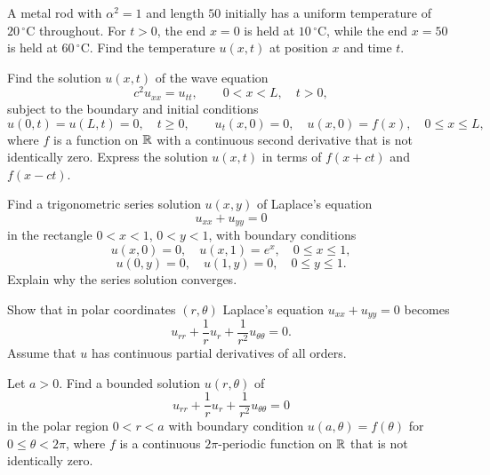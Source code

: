 \documentclass[11pt,oneside]{article}
\begin{document}
\begin{problem}
A metal rod with $\alpha^2=1$ and length $50$ initially has a uniform temperature of $20\,{}^\circ\mathrm C$ throughout. For $t>0$, the end $x=0$ is held at $10\,{}^\circ\mathrm C$, while the end $x=50$ is held at $60\,{}^\circ\mathrm C$. Find the temperature $u(x,t)$ at position $x$ and time $t$.
\end{problem}

\begin{problem}
Find the solution $u(x,t)$ of the wave equation
\[c^2u_{xx}=u_{tt},\qquad 0<x<L,\quad t>0,\]
subject to the boundary and initial conditions
\[u(0,t)=u(L,t)=0,\quad t\ge0,\qquad u_t(x,0)=0,\quad u(x,0)=f(x),\quad 0\le x\le L,\]
where $f$ is a function on $\mathbb{R}$ with a continuous second derivative that is not identically zero. Express the solution $u(x,t)$ in terms of $f(x+ct)$ and $f(x-ct)$.
\end{problem}

\begin{problem}
Find a trigonometric series solution $u(x,y)$ of Laplace's equation
\[u_{xx}+u_{yy}=0\]
in the rectangle $0<x<1$, $0<y<1$, with boundary conditions
\[u(x,0)=0,\quad u(x,1)=e^x,\quad 0\le x\le1,\]
\[u(0,y)=0,\quad u(1,y)=0,\quad 0\le y\le1.\]
Explain why the series solution converges.
\end{problem}

\begin{problem}
Show that in polar coordinates $(r,\theta)$ Laplace's equation $u_{xx}+u_{yy}=0$ becomes
\[u_{rr}+\frac1r u_r+\frac1{r^2}u_{\theta\theta}=0.\]
Assume that $u$ has continuous partial derivatives of all orders.
\end{problem}

\begin{problem}
Let $a>0$. Find a bounded solution $u(r,\theta)$ of
\[u_{rr}+\frac1r u_r+\frac1{r^2}u_{\theta\theta}=0\]
in the polar region $0<r<a$ with boundary condition $u(a,\theta)=f(\theta)$ for $0\le\theta<2\pi$, where $f$ is a continuous $2\pi$-periodic function on $\mathbb{R}$ that is not identically zero.
\end{problem}
\end{document}
